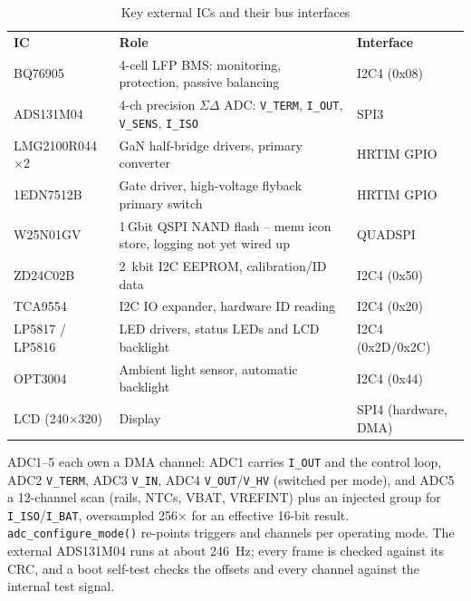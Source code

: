 \begin{table}[h!]
    \centering
    \begin{tabular}{p{3cm}p{6cm}p{2.5cm}}
        \rowcolor{gray} \textbf{IC} & \textbf{Role} & \textbf{Interface} \\
        BQ76905 & 4-cell \ac{LFP} \ac{BMS}: monitoring, protection, passive balancing & \ac{I2C}4 (0x08) \\
        ADS131M04 & 4-ch precision $\Sigma\Delta$ \ac{ADC}: \texttt{V\_TERM}, \texttt{I\_OUT}, \texttt{V\_SENS}, \texttt{I\_ISO} & \ac{SPI}3 \\
        LMG2100R044 $\times$2 & \ac{GaN} half-bridge drivers, primary converter & \ac{HRTIM} \ac{GPIO} \\
        1EDN7512B & Gate driver, high-voltage flyback primary switch & \ac{HRTIM} \ac{GPIO} \\
        W25N01GV & 1\,Gbit QSPI NAND flash -- menu icon store, logging not yet wired up & QUADSPI \\
        ZD24C02B & \qty{2}{\kilo bit} \ac{I2C} \ac{EEPROM}, calibration/ID data & \ac{I2C}4 (0x50) \\
        TCA9554 & \ac{I2C} \ac{IO} expander, hardware ID reading & \ac{I2C}4 (0x20) \\
        LP5817 / LP5816 & \ac{LED} drivers, status \acp{LED} and \ac{LCD} backlight & \ac{I2C}4 (0x2D/0x2C) \\
        OPT3004 & Ambient light sensor, automatic backlight & \ac{I2C}4 (0x44) \\
        \ac{LCD} (240$\times$320) & Display & \ac{SPI}4 (hardware, \ac{DMA}) \\
    \end{tabular}
    \caption{Key external \acp{IC} and their bus interfaces}
\end{table}

\ac{ADC}1--5 each own a \ac{DMA} channel: \ac{ADC}1 carries \texttt{I\_OUT}
and the control loop, \ac{ADC}2 \texttt{V\_TERM}, \ac{ADC}3 \texttt{V\_IN},
\ac{ADC}4 \texttt{V\_OUT}/\texttt{V\_HV} (switched per mode), and \ac{ADC}5
a 12-channel scan (rails, \acp{NTC}, VBAT, VREFINT) plus an injected group
for \texttt{I\_ISO}/\texttt{I\_BAT}, oversampled 256$\times$ for an
effective 16-bit result. \texttt{adc\_configure\_mode()} re-points triggers
and channels per operating mode. The external ADS131M04 runs at about
\qty{246}{\hertz}; every frame is checked against its \ac{CRC}, and a boot
self-test checks the offsets and every channel against the internal test
signal.

